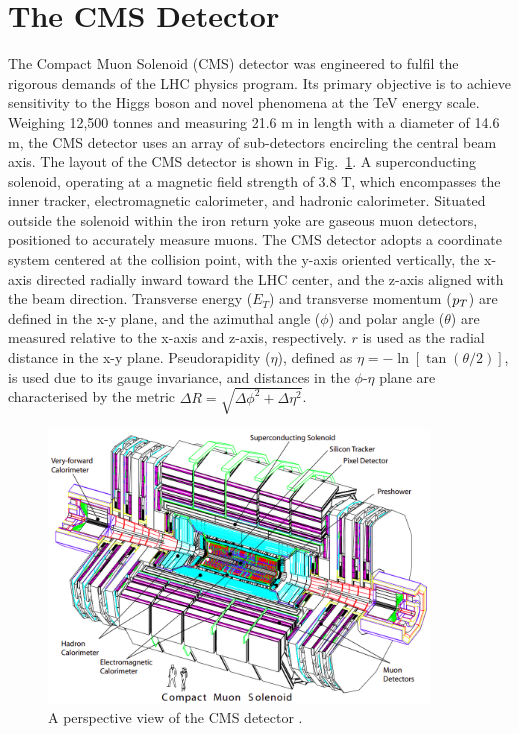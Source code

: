 \section{The CMS Detector}

The Compact Muon Solenoid (CMS) detector was engineered to fulfil the rigorous demands of the LHC physics program. 
Its primary objective is to achieve sensitivity to the Higgs boson and novel phenomena at the TeV energy scale. 
Weighing 12,500 tonnes and measuring 21.6 m in length with a diameter of 14.6 m, the CMS detector uses an array of sub-detectors encircling the central beam axis. 
The layout of the CMS detector is shown in Fig.~\ref{fig:CMS_Schematic}.
A superconducting solenoid, operating at a magnetic field strength of 3.8 T, which encompasses the inner tracker, electromagnetic calorimeter, and hadronic calorimeter. 
Situated outside the solenoid within the iron return yoke are gaseous muon detectors, positioned to accurately measure muons. 
The CMS detector adopts a coordinate system centered at the collision point, with the y-axis oriented vertically, the x-axis directed radially inward toward the LHC center, and the z-axis aligned with the beam direction. Transverse energy ($E_T$) and transverse momentum ($p_{T}$) are defined in the x-y plane, and the azimuthal angle ($\phi$) and polar angle ($\theta$) are measured relative to the x-axis and z-axis, respectively. 
$r$ is used as the radial distance in the x-y plane.
Pseudorapidity ($\eta$), defined as $\eta = -\ln[\tan(\theta/2)]$, is used due to its gauge invariance, and distances in the $\phi$-$\eta$ plane are characterised by the metric $\Delta R = \sqrt{\Delta\phi^2 + \Delta\eta^2}$. 

\begin{figure}[h]
    \centering
    \includegraphics[width=0.9\textwidth]{Figures/CMS_Detector.png}
    \caption{A perspective view of the CMS detector \cite{CMS_Setup}.}
    \label{fig:CMS_Schematic}
\end{figure}

